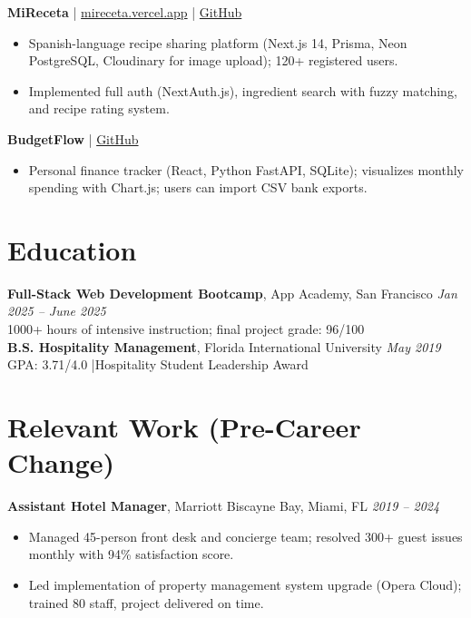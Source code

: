 \documentclass[11pt,a4paper]{article}
\begin{document}
\vspace{4pt}
\noindent\textbf{MiReceta} \textcolor{accent}{|} \href{https://mireceta.vercel.app}{mireceta.vercel.app} \textcolor{accent}{|} \href{https://github.com/mariagarcia-dev/mireceta}{GitHub}
\begin{itemize}
  \item Spanish-language recipe sharing platform (Next.js 14, Prisma, Neon PostgreSQL, Cloudinary for image upload); 120+ registered users.
  \item Implemented full auth (NextAuth.js), ingredient search with fuzzy matching, and recipe rating system.
\end{itemize}

\vspace{4pt}
\noindent\textbf{BudgetFlow} \textcolor{accent}{|} \href{https://github.com/mariagarcia-dev/budgetflow}{GitHub}
\begin{itemize}
  \item Personal finance tracker (React, Python FastAPI, SQLite); visualizes monthly spending with Chart.js; users can import CSV bank exports.
\end{itemize}

\section{Education}

\noindent\textbf{Full-Stack Web Development Bootcamp}, App Academy, San Francisco \hfill \textit{Jan 2025 -- June 2025}\\
1000+ hours of intensive instruction; final project grade: 96/100\\[4pt]
\noindent\textbf{B.S. Hospitality Management}, Florida International University \hfill \textit{May 2019}\\
GPA: 3.71/4.0 \quad|\quad Hospitality Student Leadership Award

\section{Relevant Work (Pre-Career Change)}

\noindent\textbf{Assistant Hotel Manager}, Marriott Biscayne Bay, Miami, FL \hfill \textit{2019 -- 2024}
\begin{itemize}
  \item Managed 45-person front desk and concierge team; resolved 300+ guest issues monthly with 94\% satisfaction score.
  \item Led implementation of property management system upgrade (Opera Cloud); trained 80 staff, project delivered on time.
\end{itemize}
\end{document}
